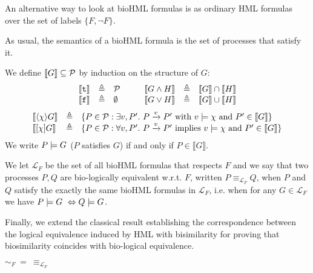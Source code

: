 \begin{remark}
An alternative way to look at bioHML formulas is as ordinary HML formulas over the set of labels $\{F,\neg F\}$.
\end{remark}

As usual, the semantics of a bioHML formula is the set of processes that satisfy it.

\begin{definition}[semantics of $G$]
 We define $\llbracket G\rrbracket \subseteq {\cal P}$ by induction on the structure of $G$:
\[
\begin{array}{ccl@{\hspace{1cm}}ccl}
 \llbracket {\tt t}\rrbracket &\defeq& {\cal P} &  \llbracket G\wedge H\rrbracket &\defeq&  \llbracket G\rrbracket  \cap \llbracket H\rrbracket  \\
\llbracket {\tt f}\rrbracket& \defeq& \emptyset &
  \llbracket G\vee H\rrbracket &\defeq&  \llbracket G\rrbracket  \cup \llbracket H\rrbracket \\
\end{array}
\]
\[
\begin{array}{lcl}
 \llbracket  \langle \chi \rangle G \rrbracket &\triangleq& \{P \in {\cal P}: \exists v,P'.\ P\xrightarrow{v}P' \mbox{ with } v \models \chi \mbox{ and } P' \in  \llbracket  G \rrbracket\} \\
 \llbracket [\chi]G \rrbracket &\triangleq& \{P \in {\cal P}: \forall v,P'.\ P\xrightarrow{v}P' \mbox{ implies } v \models \chi \mbox{ and } P' \in  \llbracket  G \rrbracket\}
\end{array}
\]
We write $P \models G$ ($P$ satisfies $G$) if and only if $P \in  \llbracket G \rrbracket$.
\end{definition}

We let $\mathcal{L}_F$ be the set of all bioHML formulas that respects $F$ and 
we say that two processes $P,Q$ are bio-logically equivalent w.r.t. $F$, written $P \equiv_{\mathcal{L}_F}Q$, when $P$ and $Q$ satisfy the exactly the same bioHML formulas in $\mathcal{L}_F$, i.e. when for any $G\in \mathcal{L}_F$ we have $P \models G\ \Leftrightarrow Q \models G$.

Finally, we extend the classical result establishing the correspondence between the logical equivalence induced by HML with bisimilarity for proving that biosimilarity coincides with bio-logical equivalence.

\begin{theorem}
$\sim_F\ =\ \equiv_{\mathcal{L}_F}$
\end{theorem}

